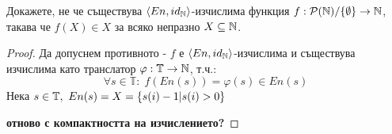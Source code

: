 \begin{problem}
Докажете, не че съществува $\langle En, id_{\mathbb{N}}\rangle$-изчислима функция $f :\mathcal P({\mathbb{N}}) \slash \{\emptyset\} \to {\mathbb{N}}$, такава че $f(X) \in X$ за всяко непразно $X \subseteq {\mathbb{N}}$.
\end{problem}
\begin{proof}
    Да допуснем противното - $f$ е $\langle En, id_{\mathbb{N}}\rangle$-изчислима и  съществува изчислима като транслатор $\varphi: \mathbb T \to {\mathbb{N}}$, т.ч.:
    \begin{equation}
        \forall s \in \mathbb T:\; f(En(s)) = \varphi(s) \in En(s)
    \end{equation}
    Нека $s \in \mathbb T,\ En(s) = X = \left\{s(i) - 1 | s(i) > 0\right\}$

    \textbf{отново с компактността на изчислението?}
\end{proof}